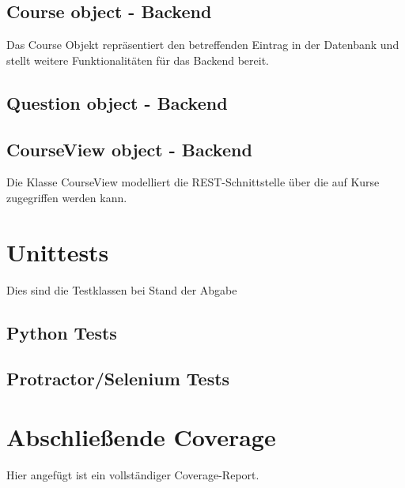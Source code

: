 \documentclass[accentcolor=tud0b,12pt,paper=a4]{tudreport}
\begin{document}
\section*{Course object - Backend}
Das Course Objekt repräsentiert den betreffenden Eintrag in der Datenbank und stellt weitere Funktionalitäten für das Backend bereit.



\section*{Question object - Backend} 



\section*{CourseView object - Backend}
Die Klasse CourseView modelliert die REST-Schnittstelle über die auf Kurse zugegriffen werden kann.



\chapter{Unittests}

Dies sind die Testklassen bei Stand der Abgabe

\section{Python Tests}


\section{Protractor/Selenium Tests}


\chapter{Abschließende Coverage}
Hier angefügt ist ein vollständiger Coverage-Report.








\end{document}
